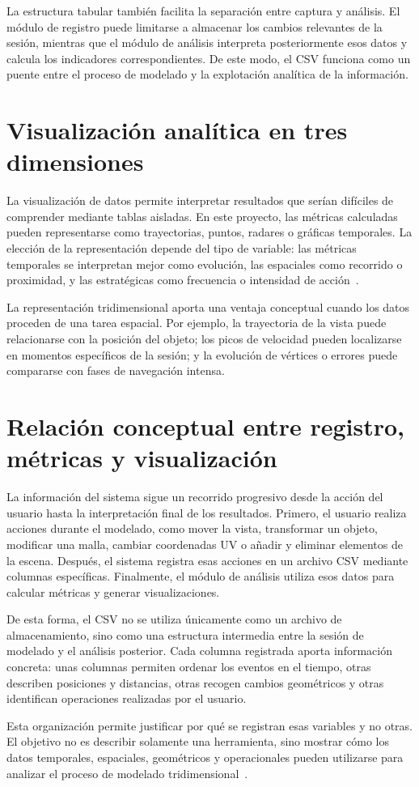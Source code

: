 La estructura tabular también facilita la separación entre captura y análisis. El módulo de registro puede limitarse a almacenar los cambios relevantes de la sesión, mientras que el módulo de análisis interpreta posteriormente esos datos y calcula los indicadores correspondientes. De este modo, el CSV funciona como un puente entre el proceso de modelado y la explotación analítica de la información.

\section{Visualización analítica en tres dimensiones}

La visualización de datos permite interpretar resultados que serían difíciles de comprender mediante tablas aisladas. En este proyecto, las métricas calculadas pueden representarse como trayectorias, puntos, radares o gráficas temporales. La elección de la representación depende del tipo de variable: las métricas temporales se interpretan mejor como evolución, las espaciales como recorrido o proximidad, y las estratégicas como frecuencia o intensidad de acción~\cite{munzner2014visualization}.

La representación tridimensional aporta una ventaja conceptual cuando los datos proceden de una tarea espacial. Por ejemplo, la trayectoria de la vista puede relacionarse con la posición del objeto; los picos de velocidad pueden localizarse en momentos específicos de la sesión; y la evolución de vértices o errores puede compararse con fases de navegación intensa.

\section{Relación conceptual entre registro, métricas y visualización}

La información del sistema sigue un recorrido progresivo desde la acción del usuario hasta la interpretación final de los resultados. Primero, el usuario realiza acciones durante el modelado, como mover la vista, transformar un objeto, modificar una malla, cambiar coordenadas UV o añadir y eliminar elementos de la escena. Después, el sistema registra esas acciones en un archivo CSV mediante columnas específicas. Finalmente, el módulo de análisis utiliza esos datos para calcular métricas y generar visualizaciones.

De esta forma, el CSV no se utiliza únicamente como un archivo de almacenamiento, sino como una estructura intermedia entre la sesión de modelado y el análisis posterior. Cada columna registrada aporta información concreta: unas columnas permiten ordenar los eventos en el tiempo, otras describen posiciones y distancias, otras recogen cambios geométricos y otras identifican operaciones realizadas por el usuario.

Esta organización permite justificar por qué se registran esas variables y no otras. El objetivo no es describir solamente una herramienta, sino mostrar cómo los datos temporales, espaciales, geométricos y operacionales pueden utilizarse para analizar el proceso de modelado tridimensional~\cite{gao2021,gao2023}.